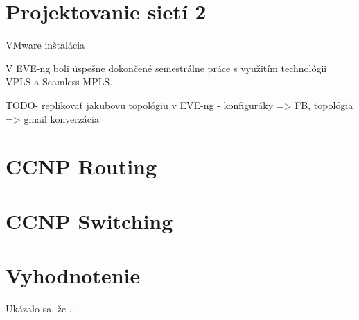 \section{Projektovanie sietí 2}

VMware inštalácia

V EVE-ng boli úspešne dokončené semestrálne práce s využitím technológii VPLS a Seamless MPLS.

{\huge TODO- replikovať jakubovu topológiu v EVE-ng - konfiguráky => FB, topológia => gmail konverzácia}




\section{CCNP Routing}





\section{CCNP Switching}




\section{Vyhodnotenie}

Ukázalo sa, že ...